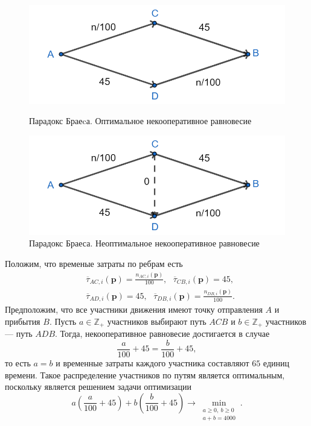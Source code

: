 \documentclass[12pt, a4paper]{article}
\begin{document}
\begin{figure}[H]
	\begin{center}
		\begin{minipage}[h]{0.4\linewidth}
			\includegraphics[width=1\linewidth]{imgs/before_braess.png}
			\caption{Парадокс Браеcа. Оптимальное некооперативное равновесие}
			\label{ris:braess_1}
		\end{minipage}
		\hfill
		\begin{minipage}[h]{0.4\linewidth}
			\includegraphics[width=1\linewidth]{imgs/after_braess.png}
			\caption{Парадокс Браеса. Неоптимальное некооперативное равновесие}
			\label{ris:braess_2}
		\end{minipage}
	\end{center}
\end{figure}


Положим, что временые затраты по ребрам есть 
\begin{align*}
	&\overline{\tau}_{AC, i} (\textbf{p}) = \frac{n_{AC, i} (\textbf{p})}{100}, \text{ }  \overline{\tau}_{CB, i} (\textbf{p}) = 45,
	\\
	&\overline{\tau}_{AD, i} (\textbf{p}) = 45, \text{ }  \overline{\tau}_{DB, i} (\textbf{p}) = \frac{n_{DB, i} (\textbf{p})}{100}.
\end{align*}
Предположим, что все участники движения имеют точку отправления $A$ и прибытия $B$. Пусть $a \in \mathbb{Z}_+$ участников выбирают путь $ACB$ и $b  \in \mathbb{Z}_+$ участников --- путь $ADB$. Тогда, некооперативное равновесие достигается в случае
$$\frac{a}{100} + 45 = \frac{b}{100} + 45,$$
то есть $a = b$ и временные затраты каждого участника составляют $65$ единиц времени. Такое распределение участников по путям является оптимальным, поскольку является решением задачи оптимизации
$$a\left(\frac{a}{100} + 45\right) + b\left(\frac{b}{100} + 45\right) \rightarrow \min\limits_{\substack{a \ge 0, \: b \ge 0 \\ a + b = 4000}}.$$
\end{document}
